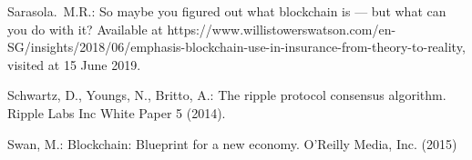 \documentclass{KERauth}
\begin{document}
\begin{thebibliography}
\item Sarasola.~M.R.: So maybe you figured out what blockchain is — but what can you do with it? Available at https://www.willistowerswatson.com/en-SG/insights/2018/06/emphasis-blockchain-use-in-insurance-from-theory-to-reality, visited at 15 June 2019.

\item Schwartz, D., Youngs, N., Britto, A.: The ripple protocol consensus algorithm.
Ripple Labs Inc White Paper 5 (2014).

\item Swan, M.: Blockchain: Blueprint for a new economy. O’Reilly Media, Inc. (2015)

\end{thebibliography}
\end{document}
